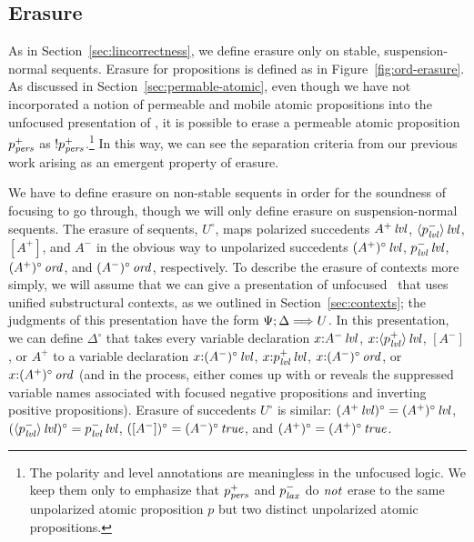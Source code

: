 

\subsection{Erasure}

As in Section~\ref{sec:lincorrectness}, 
we define erasure only on stable, suspension-normal
sequents. Erasure for propositions is defined as in
Figure~\ref{fig:ord-erasure}. As discussed in
Section~\ref{sec:permable-atomic}, even though we have not
incorporated a notion of permeable and mobile atomic propositions into
the unfocused presentation of \ollll, it is possible to erase a
permeable atomic proposition $p^+_{\it pers}$ as
${!}p^+_{\it pers}$.\footnote{The polarity and level annotations are
  meaningless in the unfocused logic. We keep them only to emphasize
  that $p^+_{\it pers}$ and $p^-_{\it lax}$ do $\it not$ erase to the same
  unpolarized atomic proposition $p$ but two distinct unpolarized
  atomic propositions.}  In this way, we can see the separation
criteria from our previous work
\cite{simmons08linear,pfenning09substructural} arising as an emergent
property of erasure.

We have to define erasure on non-stable sequents in order for the
soundness of focusing to go through, though we will only define
erasure on suspension-normal sequents.  The erasure of sequents,
$U^\circ$, maps polarized succedents ${A^+}\,{{\it lvl}}$,
${\langle {p^-_{\it lvl}} \rangle}\,{{\it lvl}}$, $[A^+]$, and $A^-$ in the obvious way to
unpolarized succedents ${(A^+)^\circ}\,{{\it lvl}}$, ${p^-_{\it lvl}}\,{{\it lvl}}$,
${(A^+)^\circ}\,{{\it ord}}$, and ${(A^-)^\circ}\,{{\it ord}}$, respectively.  To
describe the erasure of contexts more simply, we will assume that we
can give a presentation of unfocused \ollll~that uses unified
substructural contexts, as we outlined in
Section~\ref{sec:contexts}; the judgments of this presentation
have the form $\Psi; \Delta \Longrightarrow U$. 
In this presentation, we can define $\Delta^\circ$ that
takes every variable declaration $x{:}{A^-}\,{{\it lvl}}$, $x{:}{\langle {p^+_{\it lvl}} \rangle}\,{{\it lvl}}$,
$[A^-]$, or $A^+$ to a variable declaration $x{:}{(A^-)^\circ}\,{{\it lvl}}$,
$x{:}{p^+_{\it lvl}}\,{{\it lvl}}$, $x{:}{(A^-)^\circ}\,{{\it ord}}$, or
$x{:}{(A^+)^\circ}\,{{\it ord}}$ (and in the process, either comes up with
or reveals the suppressed variable names associated with focused
negative propositions and inverting positive propositions).
Erasure of succedents $U^\circ$ is similar: 
$({A^+}\,{{\it lvl}})^\circ = {(A^+)^\circ}\,{{\it lvl}}$,
$({\langle {p^-_{\it lvl}} \rangle}\,{{\it lvl}})^\circ = {p^-_{\it lvl}}\,{{\it lvl}}$, 
$([A^-])^\circ = {(A^-)^\circ}\,{{\it true}}$, and
$(A^+)^\circ = {(A^+)^\circ}\,{{\it true}}$. 

